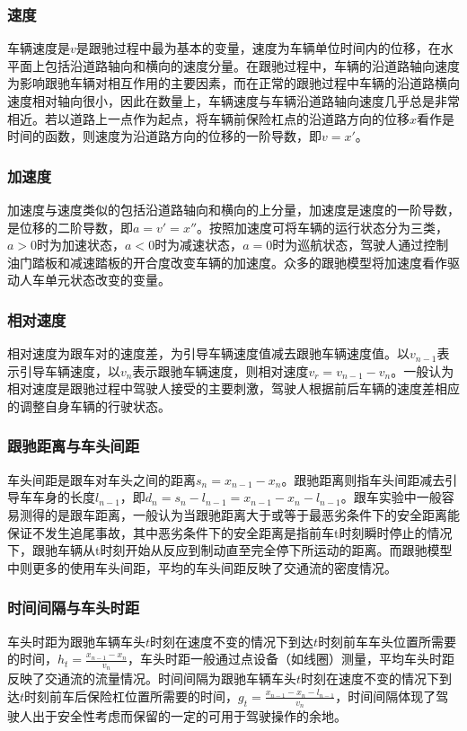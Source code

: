 \subsubsection{速度}
车辆速度是$v$是跟驰过程中最为基本的变量，速度为车辆单位时间内的位移，在水平面上包括沿道路轴向和横向的速度分量。在跟驰过程中，车辆的沿道路轴向速度为影响跟驰车辆对相互作用的主要因素，而在正常的跟驰过程中车辆的沿道路横向速度相对轴向很小，因此在数量上，车辆速度与车辆沿道路轴向速度几乎总是非常相近。若以道路上一点作为起点，将车辆前保险杠点的沿道路方向的位移$x$看作是时间的函数，则速度为沿道路方向的位移的一阶导数，即$v=x'$。

\subsubsection{加速度}
加速度与速度类似的包括沿道路轴向和横向的上分量，加速度是速度的一阶导数，是位移的二阶导数，即$a=v'=x''$。按照加速度可将车辆的运行状态分为三类，$a>0$时为加速状态，$a<0$时为减速状态，$a=0$时为巡航状态，驾驶人通过控制油门踏板和减速踏板的开合度改变车辆的加速度。众多的跟驰模型将加速度看作驱动人车单元状态改变的变量。

\subsubsection{相对速度}
相对速度为跟车对的速度差，为引导车辆速度值减去跟驰车辆速度值。以$v_{n-1}$表示引导车辆速度，以$v_n$表示跟驰车辆速度，则相对速度$v_r=v_{n-1}-v_n$。一般认为相对速度是跟驰过程中驾驶人接受的主要刺激，驾驶人根据前后车辆的速度差相应的调整自身车辆的行驶状态。

\subsubsection{跟驰距离与车头间距}
车头间距是跟车对车头之间的距离$s_n=x_{n-1}-x_n$。跟驰距离则指车头间距减去引导车车身的长度$l_{n-1}$，即$d_n=s_n-l_{n-1}=x_{n-1}-x_n-l_{n-1}$。跟车实验中一般容易测得的是跟车距离，一般认为当跟驰距离大于或等于最恶劣条件下的安全距离能保证不发生追尾事故，其中恶劣条件下的安全距离是指前车t时刻瞬时停止的情况下，跟驰车辆从t时刻开始从反应到制动直至完全停下所运动的距离。而跟驰模型中则更多的使用车头间距，平均的车头间距反映了交通流的密度情况。

\subsubsection{时间间隔与车头时距}
车头时距为跟驰车辆车头$t$时刻在速度不变的情况下到达$t$时刻前车车头位置所需要的时间，$h_t=\frac{x_{n-1}-x_n}{v_n}$，车头时距一般通过点设备（如线圈）测量，平均车头时距反映了交通流的流量情况。时间间隔为跟驰车辆车头$t$时刻在速度不变的情况下到达$t$时刻前车后保险杠位置所需要的时间，$g_t=\frac{x_{n-1}-x_n-l_{n-1}}{v_n}$，时间间隔体现了驾驶人出于安全性考虑而保留的一定的可用于驾驶操作的余地。

